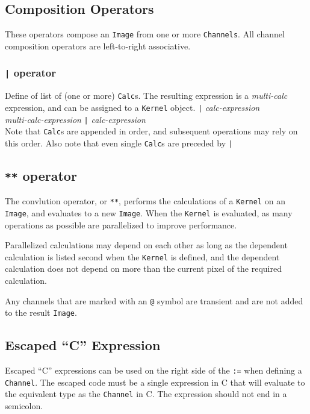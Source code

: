 \subsection{Composition Operators}
\label{ssec:compositionops}
These operators compose an \texttt{Image} from one or more \texttt{Channels}.
All channel composition operators are left-to-right associative.

\subsubsection{\texttt{|} operator}
\label{sssec:barop}
Define of list of (one or more) \texttt{Calc}s. The resulting expression is a
\emph{multi-calc} expression, and can be assigned
to a \texttt{Kernel} object.
\startsyn
\texttt{|} \emph{calc-expression} \\
\emph{multi-calc-expression} \texttt{|} \emph{calc-expression} \\
\stopsyn
Note that \texttt{Calc}s are appended in order, and
subsequent operations may rely on this order.
Also note that even single \texttt{Calc}s are preceded by \texttt{|}

\subsection{\texttt{**} operator}
\label{ssec:convolutionop}

The convlution operator, or \texttt{**}, performs the calculations of a
\texttt{Kernel} on an \texttt{Image}, and evaluates to a new \texttt{Image}.
When the \texttt{Kernel} is evaluated, as many operations as possible are
parallelized to improve performance.

Parallelized calculations may depend on each other as long as the
dependent calculation is listed second when the \texttt{Kernel} is
defined, and the dependent calculation does not depend on more than
the current pixel of the required calculation.

Any channels that are marked with an \texttt{@} symbol are transient and
are not added to the result \texttt{Image}.

\subsection{Escaped ``C'' Expression}
\label{ssec:escapedC}

Escaped ``C'' expressions can be used on the right side of the \texttt{:=}
when defining a \texttt{Channel}. The escaped code must be a single expression
in C that will evaluate to the equivalent type as the \texttt{Channel} in C.
The expression should not end in a semicolon.

